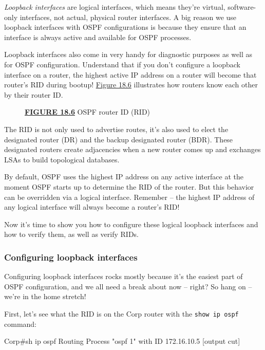 \emph{Loopback interfaces} are logical interfaces, which means they're
virtual, software-only interfaces, not actual, physical router
interfaces. A big reason we use loopback interfaces with OSPF
configurations is because they ensure that an interface is always active
and available for OSPF processes.

Loopback interfaces also come in very handy for diagnostic purposes as
well as for OSPF configuration. Understand that if you don't configure a
loopback interface on a router, the highest active IP address on a
router will become that router's RID during bootup!
\protect\hyperlink{c18.xhtmlux5cux23figure18-6}{Figure 18.6} illustrates
how routers know each other by their router ID.

\begin{figure}
\centering
\caption{{\protect\hyperlink{c18.xhtmlux5cux23figureanchor18-6}{\textbf{FIGURE
18.6}} OSPF router ID (RID)}}
\end{figure}

The RID is not only used to advertise routes, it's also used to elect
the designated router (DR) and the backup designated router (BDR). These
designated routers create adjacencies when a new router comes up and
exchanges LSAs to build topological databases.

\begin{note}
By default, OSPF uses the highest IP address on any active interface at the moment OSPF starts up to determine the RID of the router.
But this behavior can be overridden via a logical interface.
Remember -- the highest IP address of any logical interface will always become a router's RID!
\end{note}


Now it's time to show you how to configure these logical loopback interfaces and how to verify them, as well as verify RIDs.


\subsubsection{Configuring loopback interfaces}

Configuring loopback interfaces rocks mostly because it's the easiest
part of OSPF configuration, and we all need a break about now -- right?
So hang on -- we're in the home stretch!

First, let's see what the RID is on the Corp router with the
\texttt{show\ ip\ ospf} command:

\begin{cli}
Corp#sh ip ospf
 Routing Process "ospf 1" with ID 172.16.10.5
[output cut]
\end{cli}


